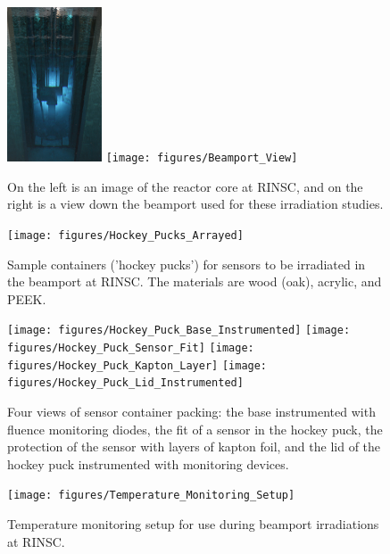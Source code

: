   \begin{figure}[!hbt]
  \begin{center}
    \includegraphics[width=0.25\textwidth]{figures/RINSC_Reactor_Core}
    \texttt{[image: figures/Beamport\_View]}
    \caption{On the left is an image of the reactor core at RINSC, and on the right is a view down the beamport used for these irradiation studies.}
    \label{fig:RINSC_Facility}
  \end{center}
\end{figure}

\begin{figure}[!hbt]
  \begin{center}
    \texttt{[image: figures/Hockey\_Pucks\_Arrayed]}
    \caption{Sample containers ('hockey pucks') for sensors to be irradiated in the beamport at RINSC. The materials are wood (oak), acrylic, and PEEK.}
    \label{fig:Pucks_Arrayed}
  \end{center}
\end{figure}

  \begin{figure}[!hbt]
  \begin{center}
    \texttt{[image: figures/Hockey\_Puck\_Base\_Instrumented]}  
    \texttt{[image: figures/Hockey\_Puck\_Sensor\_Fit]}
    \texttt{[image: figures/Hockey\_Puck\_Kapton\_Layer]}
    \texttt{[image: figures/Hockey\_Puck\_Lid\_Instrumented]}    
    \caption{Four views of sensor container packing: the base instrumented with fluence monitoring diodes, the fit of a sensor in the hockey puck, the protection of the sensor with layers of kapton foil, and the lid of the hockey puck instrumented with monitoring devices.}
    \label{fig:Puck_Packing}
  \end{center}
\end{figure}

\begin{figure}[!hbt]
  \begin{center}
    \texttt{[image: figures/Temperature\_Monitoring\_Setup]}
    \caption{Temperature monitoring setup for use during beamport irradiations at RINSC.}
    \label{fig:Temperature_Monitoring_Setup}
  \end{center}
\end{figure}


